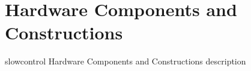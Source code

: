\section{Hardware Components and Constructions}

slowcontrol Hardware Components and Constructions description

